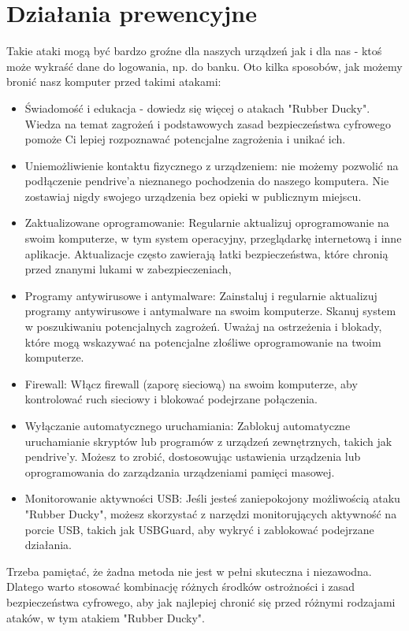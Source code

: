\documentclass{article}
\begin{document}
\section{Działania prewencyjne}

Takie ataki mogą być bardzo groźne dla naszych urządzeń jak i dla nas - ktoś może wykraść dane do logowania, np. do banku.
Oto kilka sposobów, jak możemy bronić nasz komputer przed takimi atakami:
\begin{itemize}
    \item Świadomość i edukacja - dowiedz się więcej o atakach "Rubber Ducky". Wiedza na temat zagrożeń i podstawowych zasad bezpieczeństwa cyfrowego pomoże Ci lepiej rozpoznawać potencjalne zagrożenia i unikać ich.
    \item Uniemożliwienie kontaktu fizycznego z urządzeniem: nie możemy pozwolić na podłączenie pendrive'a nieznanego pochodzenia do naszego komputera. Nie zostawiaj nigdy swojego urządzenia bez opieki w publicznym miejscu.
    \item Zaktualizowane oprogramowanie: Regularnie aktualizuj oprogramowanie na swoim komputerze, w tym system operacyjny, przeglądarkę internetową i inne aplikacje. Aktualizacje często zawierają łatki bezpieczeństwa, które chronią przed znanymi lukami w zabezpieczeniach,
    \item Programy antywirusowe i antymalware: Zainstaluj i regularnie aktualizuj programy antywirusowe i antymalware na swoim komputerze. Skanuj system w poszukiwaniu potencjalnych zagrożeń. Uważaj na ostrzeżenia i blokady, które mogą wskazywać na potencjalne złośliwe oprogramowanie na twoim komputerze.
    \item Firewall: Włącz firewall (zaporę sieciową) na swoim komputerze, aby kontrolować ruch sieciowy i blokować podejrzane połączenia.
    \item Wyłączanie automatycznego uruchamiania: Zablokuj automatyczne uruchamianie skryptów lub programów z urządzeń zewnętrznych, takich jak pendrive'y. Możesz to zrobić, dostosowując ustawienia urządzenia lub oprogramowania do zarządzania urządzeniami pamięci masowej.
    \item Monitorowanie aktywności USB: Jeśli jesteś zaniepokojony możliwością ataku "Rubber Ducky", możesz skorzystać z narzędzi monitorujących aktywność na porcie USB, takich jak USBGuard, aby wykryć i zablokować podejrzane działania.
\end{itemize}

Trzeba pamiętać, że żadna metoda nie jest w pełni skuteczna i niezawodna. Dlatego warto stosować kombinację różnych środków ostrożności i zasad bezpieczeństwa cyfrowego, aby jak najlepiej chronić się przed różnymi rodzajami ataków, w tym atakiem "Rubber Ducky".
\end{document}

